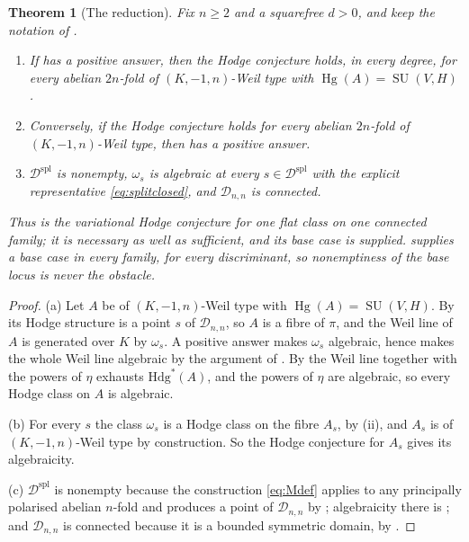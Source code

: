\documentclass[11pt,reqno]{amsart}
\theoremstyle{plain}
\newtheorem{theorem}{Theorem}[section]
\theoremstyle{definition}
\theoremstyle{remark}
\newcommand{\cD}{\mathcal{D}}
\newcommand{\Hdg}{\mathrm{Hdg}}
\DeclareMathOperator{\Hg}{Hg}
\DeclareMathOperator{\SU}{SU}
\begin{document}
\begin{theorem}[The reduction]\label{thm:residual}
Fix $n\ge2$ and a squarefree $d>0$, and keep the notation of
.
\begin{enumerate}[label=\textup{(\alph*)},nosep]
\item If  has a positive answer, then the Hodge conjecture
  holds, in every degree, for every abelian $2n$-fold of $(K,-1,n)$-Weil type
  with $\Hg(A)=\SU(V,H)$.
\item Conversely, if the Hodge conjecture holds for every abelian $2n$-fold of
  $(K,-1,n)$-Weil type, then  has a positive answer.
\item $\cD^{\mathrm{spl}}$ is nonempty, $\omega_{s}$ is algebraic at every
  $s\in\cD^{\mathrm{spl}}$ with the explicit representative
  \eqref{eq:splitclosed}, and $\cD_{n,n}$ is connected.
\end{enumerate}
Thus  is the variational Hodge conjecture for one flat class
on one connected family; it is necessary as well as sufficient, and its base
case is supplied.  supplies a base case in every family,
for every discriminant, so nonemptiness of the base locus is never the
obstacle.
\end{theorem}

\begin{proof}
(a) Let $A$ be of $(K,-1,n)$-Weil type with $\Hg(A)=\SU(V,H)$. By
 its Hodge structure is a point $s$ of $\cD_{n,n}$, so
$A$ is a fibre of $\pi$, and the Weil line of $A$ is generated over $K$ by
$\omega_{s}$. A positive answer makes $\omega_{s}$ algebraic, hence makes the
whole Weil line algebraic by the argument of . By
 the Weil line together with the powers of $\eta$ exhausts
$\Hdg^{*}(A)$, and the powers of $\eta$ are algebraic, so every Hodge class on
$A$ is algebraic.

(b) For every $s$ the class $\omega_{s}$ is a Hodge class on the fibre $A_{s}$,
by (ii), and $A_{s}$ is of $(K,-1,n)$-Weil type by
construction. So the Hodge conjecture for $A_{s}$ gives its algebraicity.

(c) $\cD^{\mathrm{spl}}$ is nonempty because the construction \eqref{eq:Mdef}
applies to any principally polarised abelian $n$-fold and produces a point of
$\cD_{n,n}$ by ; algebraicity there is
; and $\cD_{n,n}$ is connected because it is a
bounded symmetric domain, by .
\end{proof}
\end{document}
